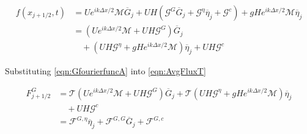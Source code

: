 \begin{align}
f(x_{j+1/2},t) &= Ue^{i {k\Delta x}/{2}}\mathcal{M} \overline{G}_j + UH\left(\mathcal{G}^G \overline{G}_j + \mathcal{G}^\eta \overline{\eta}_j + \mathcal{G}^c\right) + gH e^{i {k\Delta x}/{2}}\mathcal{M} \overline{\eta}_j  \nonumber \\ &= \left(Ue^{i {k\Delta x}/{2}}\mathcal{M} + UH \mathcal{G}^G \right) \overline{G}_j  \nonumber \\ & \quad + \left(UH\mathcal{G}^\eta + gH e^{i {k\Delta x}/{2}}\mathcal{M} \right)\overline{\eta}_j + UH\mathcal{G}^c
\label{eqn:GfourierfuncA}
\end{align}

Substituting \eqref{eqn:GfourierfuncA} into \eqref{eqn:AvgFluxT}

\begin{align}
F^G_{j+1/2} &= \mathcal{T} \left(Ue^{i {k\Delta x}/{2}}\mathcal{M} + UH \mathcal{G}^G \right) \overline{G}_j + \mathcal{T} \left(UH\mathcal{G}^\eta + gH e^{i {k\Delta x}/{2}}\mathcal{M} \right)\overline{\eta}_j   \nonumber \\
& \quad+ UH\mathcal{G}^c 
\nonumber \\ &=  \mathcal{F}^{G,\eta}\overline{\eta}_j + \mathcal{F}^{G,G}\overline{G}_j + \mathcal{F}^{G,c}
\label{eqn:FfactorsGA}
\end{align}

